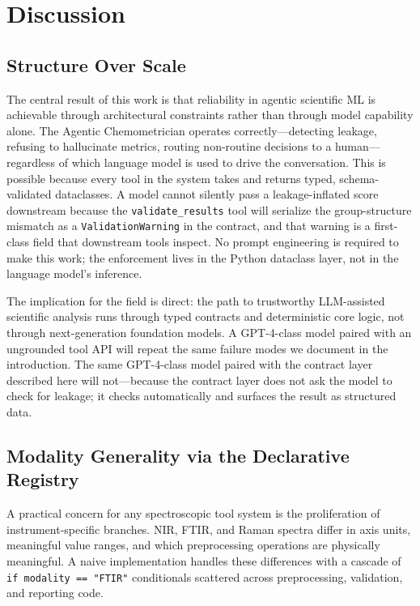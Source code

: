 
\section{Discussion}
\label{sec:discussion}

\subsection{Structure Over Scale}

The central result of this work is that reliability in agentic scientific ML
is achievable through architectural constraints rather than through model
capability alone.
The Agentic Chemometrician operates correctly---detecting leakage, refusing
to hallucinate metrics, routing non-routine decisions to a human---regardless
of which language model is used to drive the conversation.
This is possible because every tool in the system takes and returns typed,
schema-validated dataclasses.
A model cannot silently pass a leakage-inflated score downstream because the
\texttt{validate\_results} tool will serialize the group-structure mismatch
as a \texttt{ValidationWarning} in the contract, and that warning is a
first-class field that downstream tools inspect.
No prompt engineering is required to make this work; the enforcement lives in
the Python dataclass layer, not in the language model's inference.

The implication for the field is direct: the path to trustworthy LLM-assisted
scientific analysis runs through typed contracts and deterministic core logic,
not through next-generation foundation models.
A GPT-4-class model paired with an ungrounded tool API will repeat the same
failure modes we document in the introduction.
The same GPT-4-class model paired with the contract layer described here will
not---because the contract layer does not ask the model to check for leakage;
it checks automatically and surfaces the result as structured data.

\subsection{Modality Generality via the Declarative Registry}

A practical concern for any spectroscopic tool system is the proliferation of
instrument-specific branches.
NIR, FTIR, and Raman spectra differ in axis units, meaningful value ranges,
and which preprocessing operations are physically meaningful.
A naive implementation handles these differences with a cascade of
\texttt{if modality == "FTIR"} conditionals scattered across preprocessing,
validation, and reporting code.

